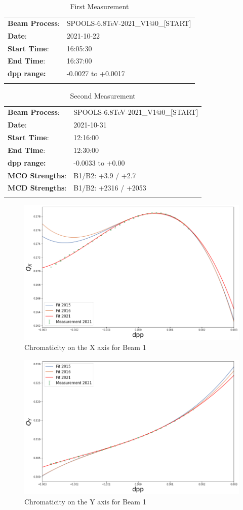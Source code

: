 \documentclass[a4paper]{cernatsnote}
\begin{document}
\begin{longtable}[h]{l l}
  \toprule
  \textbf{Beam Process}: & SPOOLS-6.8TeV-2021\_V1@0\_[START]\\
  \textbf{Date}: & 2021-10-22 \\
  \textbf{Start Time}: & 16:05:30\\
  \textbf{End Time}: & 16:37:00\\
  \textbf{dpp range:} & -0.0027 to +0.0017 \\
  \bottomrule
  \caption{First Measurement}
\end{longtable}

\begin{longtable}[h]{l l}
  \toprule
  \textbf{Beam Process}: & SPOOLS-6.8TeV-2021\_V1@0\_[START]\\
  \textbf{Date}: & 2021-10-31\\
  \textbf{Start Time}: & 12:16:00\\
  \textbf{End Time}: & 12:30:00 \\
  \textbf{dpp range:} & -0.0033 to +0.00\\
  \midrule
  \textbf{MCO Strengths}: & B1/B2: +3.9 / +2.7 \\
  \textbf{MCD Strengths}: & B1/B2: +2316 / +2053 \\
  \bottomrule
  \caption{Second Measurement}
\end{longtable}

\begin{figure}[H]
  \centering
  \includegraphics[width=.8\linewidth]{plots/beam1/qxb1.png}  
  \caption{Chromaticity on the X axis for Beam 1}
\end{figure}
\begin{figure}[H]
  \centering
  \includegraphics[width=.8\linewidth]{plots/beam1/qyb1.png}  
  \caption{Chromaticity on the Y axis for Beam 1}
\end{figure}
\end{document}
